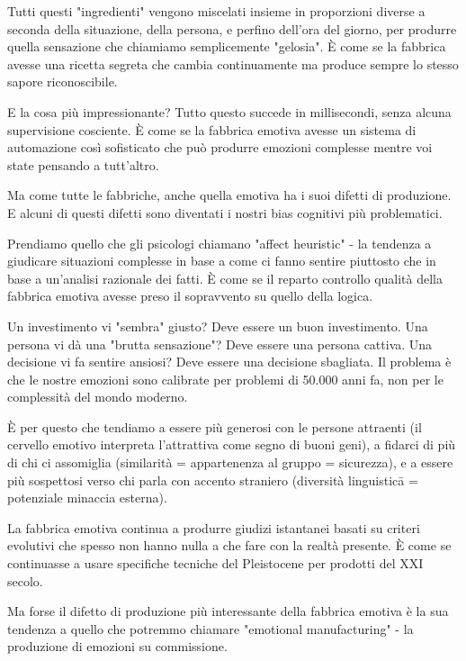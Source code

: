 Tutti questi "ingredienti" vengono miscelati insieme in proporzioni diverse a seconda della situazione, della persona, e perfino dell'ora del giorno, per produrre quella sensazione che chiamiamo semplicemente "gelosia". È come se la fabbrica avesse una ricetta segreta che cambia continuamente ma produce sempre lo stesso sapore riconoscibile.

E la cosa più impressionante? Tutto questo succede in millisecondi, senza alcuna supervisione cosciente. È come se la fabbrica emotiva avesse un sistema di automazione così sofisticato che può produrre emozioni complesse mentre voi state pensando a tutt'altro.

\medskip

Ma come tutte le fabbriche, anche quella emotiva ha i suoi difetti di produzione. E alcuni di questi difetti sono diventati i nostri bias cognitivi più problematici.

Prendiamo quello che gli psicologi chiamano "affect heuristic" - la tendenza a giudicare situazioni complesse in base a come ci fanno sentire piuttosto che in base a un'analisi razionale dei fatti. È come se il reparto controllo qualità della fabbrica emotiva avesse preso il sopravvento su quello della logica.

Un investimento vi "sembra" giusto? Deve essere un buon investimento. Una persona vi dà una "brutta sensazione"? Deve essere una persona cattiva. Una decisione vi fa sentire ansiosi? Deve essere una decisione sbagliata. Il problema è che le nostre emozioni sono calibrate per problemi di 50.000 anni fa, non per le complessità del mondo moderno.

È per questo che tendiamo a essere più generosi con le persone attraenti (il cervello emotivo interpreta l'attrattiva come segno di buoni geni), a fidarci di più di chi ci assomiglia (similarità = appartenenza al gruppo = sicurezza), e a essere più sospettosi verso chi parla con accento straniero (diversità linguisticā = potenziale minaccia esterna).

La fabbrica emotiva continua a produrre giudizi istantanei basati su criteri evolutivi che spesso non hanno nulla a che fare con la realtà presente. È come se continuasse a usare specifiche tecniche del Pleistocene per prodotti del XXI secolo.

\bigskip

Ma forse il difetto di produzione più interessante della fabbrica emotiva è la sua tendenza a quello che potremmo chiamare "emotional manufacturing" - la produzione di emozioni su commissione.

